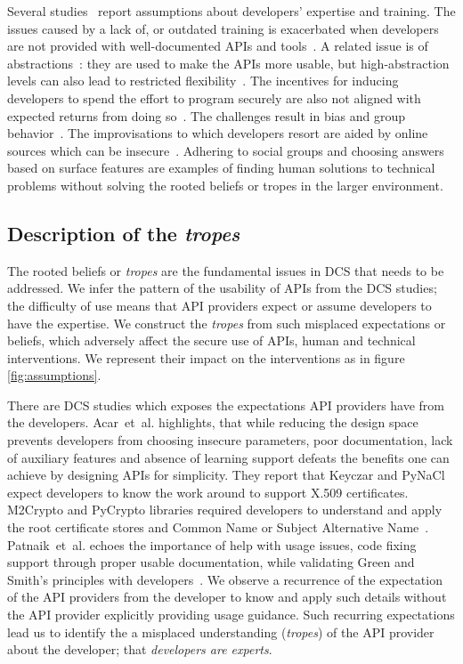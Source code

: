 \documentclass[conference]{IEEEtran}
\newcommand{\etal}[0]{et~al{.}}
\begin{document}
Several studies~\cite{zhu2014,tyler2015,whitney2015,lipford2016} report assumptions about developers' expertise and training. The issues caused by a lack of, or outdated training is exacerbated when developers are not provided with well-documented APIs and tools~\cite{Oliveira2018soups,acarusability2017,smith2020why}. A related issue is of abstractions~\cite{anderson2013,ranenberg2020}: they are used to make the APIs more usable,  but high-abstraction levels can also lead to restricted flexibility~\cite{loiacono2017ido}. The incentives for inducing developers to spend the effort to program securely are also not aligned with expected returns from doing so~\cite{erikacar2017,naiakshina2018}. The challenges result in bias and group behavior~\cite{emmasurface2020,acar2016infosources}. The improvisations to which developers resort are aided by online sources which can be insecure~\cite{fahl2012,linden2020,acar2016infosources}. Adhering to social groups and choosing answers based on surface features are examples of finding human solutions to technical problems without solving the rooted beliefs or tropes in the larger environment. 

\subsection {Description of the \emph{tropes}} 
The rooted beliefs or \emph{tropes} are the fundamental issues in \ac{DCS} that needs to be addressed. We infer the pattern of the usability of APIs from the \ac{DCS} studies; the difficulty of use means that API providers expect or assume developers to have the expertise. We construct the \emph{tropes} from such misplaced expectations or beliefs, which adversely affect the secure use of APIs, human and technical interventions. We represent their impact on the interventions as in figure \ref{fig:assumptions}. 

There are \ac{DCS} studies which exposes the expectations API providers have from the developers. Acar~\etal{} highlights, that while reducing the design space prevents developers from choosing insecure parameters, poor documentation, lack of auxiliary features and absence of learning support defeats the benefits one can achieve by designing APIs for simplicity. They report that Keyczar and PyNaCl expect developers to know the work around to support X.509 certificates. M2Crypto and PyCrypto libraries required developers to understand and apply the root certificate stores and Common Name or Subject Alternative Name~\cite{acarusability2017}. Patnaik~\etal{} echoes the importance of help with usage issues, code fixing support through proper usable documentation, while validating Green and Smith’s principles with developers~\cite{patnaik2019}.  We observe a recurrence of the expectation of the API providers from the developer to know and apply such details without the API provider explicitly providing usage guidance. Such recurring expectations lead us to identify the a misplaced understanding (\emph{tropes}) of the API provider about the developer; that \emph{developers are experts}. 
\end{document}
